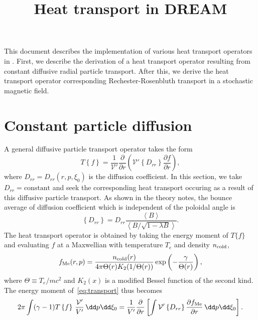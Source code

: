 \documentclass{notes}
\title{Heat transport in DREAM}
\author{}
\newcommand{\fMe}{f_{\rm Me}}
\newcommand{\ncold}{n_{\rm cold}}
\newcommand{\Te}{T_e}
\newcommand{\Vp}{\mathcal{V}'}
\newcommand{\VpVol}{V'}
\begin{document}
    \maketitle

    \noindent
    This document describes the implementation of various heat transport
    operators in \DREAM. First, we describe the derivation of a heat transport
    operator resulting from constant diffusive radial particle transport.
    After this, we derive the heat transport operator corresponding
    Rechester-Rosenbluth transport in a stochastic magnetic field.

    \tableofcontents

    \section{Constant particle diffusion}\label{sec:constant}
    A general diffusive particle transport operator takes the form
    \begin{equation}\label{eq:transport}
        T\left\{ f \right\} = \frac{1}{\Vp}\frac{\partial}{\partial r}\left(
            \Vp \left\{D_{rr}\right\}\frac{\partial f}{\partial r}
        \right),
    \end{equation}
    where $D_{rr} = D_{rr}(r,p,\xi_0)$ is the diffusion coefficient. In this
    section, we take $D_{rr} = \text{constant}$ and seek the corresponding heat
    transport occuring as a result of this diffusive particle transport. As
    shown in the theory notes, the bounce average of diffusion coefficient which
    is independent of the poloidal angle is
    \begin{equation}
        \left\{ D_{rr} \right\} = D_{rr}\frac{\left\langle B\right\rangle}{\left\langle B/\sqrt{1-\lambda B} \right\rangle}.
    \end{equation}
    The heat transport operator is obtained by taking the energy moment of
    $T\{f\}$ and evaluating $f$ at a Maxwellian with temperature $\Te$ and
    density $\ncold$,
    \begin{equation}
        \fMe(r,p) = \frac{\ncold(r)}{4\pi\Theta(r) K_2(1/\Theta(r))}\exp\left(-\frac{\gamma}{\Theta(r)}\right),
    \end{equation}
    where $\Theta\equiv\Te/mc^2$ and $K_2(x)$ is a modified Bessel function of
    the second kind. The energy moment of~\eqref{eq:transport} thus becomes
    \begin{equation}
        2\pi\int(\gamma-1) T\left\{f\right\}\,\frac{\Vp}{\VpVol}\,\dd p\dd\xi_0 =
        \frac{1}{\VpVol}\frac{\partial}{\partial r}\left[
            \int \Vp\left\{D_{rr}\right\}\frac{\partial\fMe}{\partial r}\,\dd p\dd\xi_0
        \right].
    \end{equation}
\end{document}
